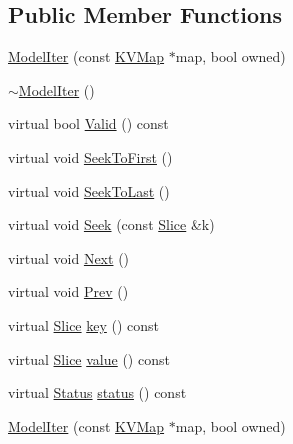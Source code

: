 \subsection*{Public Member Functions}
\begin{DoxyCompactItemize}
\item 
\hyperlink{classleveldb_1_1_model_d_b_1_1_model_iter_a8ce3cac545f29fd55cbc0328bf3dbe26}{Model\+Iter} (const \hyperlink{namespaceleveldb_aac1e50450147be263e08252c6700f7a7}{K\+V\+Map} $\ast$map, bool owned)
\item 
\hyperlink{classleveldb_1_1_model_d_b_1_1_model_iter_a3920ed0781aebe21dfccef855ff31946}{$\sim$\+Model\+Iter} ()
\item 
virtual bool \hyperlink{classleveldb_1_1_model_d_b_1_1_model_iter_a645d712995a2926a2699a6274fdd8c96}{Valid} () const 
\item 
virtual void \hyperlink{classleveldb_1_1_model_d_b_1_1_model_iter_ac3f3118f2aa6df676e40ad848929965f}{Seek\+To\+First} ()
\item 
virtual void \hyperlink{classleveldb_1_1_model_d_b_1_1_model_iter_a73f54e91a379f3584aaa1ad99f435c5f}{Seek\+To\+Last} ()
\item 
virtual void \hyperlink{classleveldb_1_1_model_d_b_1_1_model_iter_ab581a60c36582a06a835bcaf766dc124}{Seek} (const \hyperlink{classleveldb_1_1_slice}{Slice} \&k)
\item 
virtual void \hyperlink{classleveldb_1_1_model_d_b_1_1_model_iter_ae6c95ecf39787bc465ac7482fe7cf6fa}{Next} ()
\item 
virtual void \hyperlink{classleveldb_1_1_model_d_b_1_1_model_iter_acf667aa8d5e11d6acc16134959e43c40}{Prev} ()
\item 
virtual \hyperlink{classleveldb_1_1_slice}{Slice} \hyperlink{classleveldb_1_1_model_d_b_1_1_model_iter_a53ff9e91d51bc5bcab4585758a103749}{key} () const 
\item 
virtual \hyperlink{classleveldb_1_1_slice}{Slice} \hyperlink{classleveldb_1_1_model_d_b_1_1_model_iter_ad18eafbd733612fbe9f002b56334d871}{value} () const 
\item 
virtual \hyperlink{classleveldb_1_1_status}{Status} \hyperlink{classleveldb_1_1_model_d_b_1_1_model_iter_a4798d61aefbd89c93ca7ac753b695a11}{status} () const 
\item 
\hyperlink{classleveldb_1_1_model_d_b_1_1_model_iter_a8ce3cac545f29fd55cbc0328bf3dbe26}{Model\+Iter} (const \hyperlink{namespaceleveldb_aac1e50450147be263e08252c6700f7a7}{K\+V\+Map} $\ast$map, bool owned)
\item 

\end{DoxyCompactItemize}

